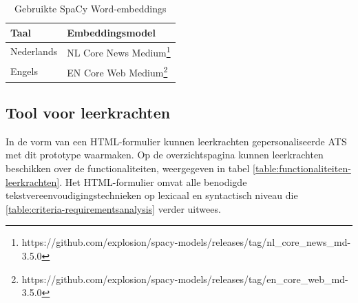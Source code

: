 \begin{center}
	\begin{table}
		\begin{tabular}{ | m{4cm} | m{12cm} | } 
			\hline
			\textbf{Taal} & \textbf{Embeddingsmodel} \\
			\hline
			Nederlands & NL Core News Medium\footnote{https://github.com/explosion/spacy-models/releases/tag/nl\_core\_news\_md-3.5.0} \\ 
			\hline
			Engels & EN Core Web Medium\footnote{https://github.com/explosion/spacy-models/releases/tag/en\_core\_web\_md-3.5.0} \\
			\hline
		\end{tabular}
		\label{table:wordembeddings-spacy}
		\caption{Gebruikte SpaCy Word-embeddings}
	\end{table}
\end{center}


\subsection{Tool voor leerkrachten}

In de vorm van een HTML-formulier kunnen leerkrachten gepersonaliseerde ATS met dit prototype waarmaken. Op de overzichtspagina kunnen leerkrachten beschikken over de functionaliteiten, weergegeven in tabel \ref{table:functionaliteiten-leerkrachten}. Het HTML-formulier omvat alle benodigde tekstvereenvoudigingstechnieken op lexicaal en syntactisch niveau die \ref{table:criteria-requirementsanalysis} verder uitwees. 

